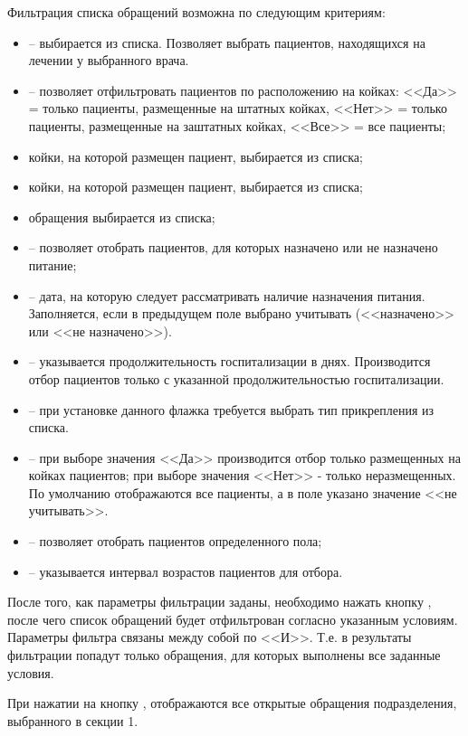 Фильтрация списка обращений возможна по следующим критериям:
\begin{itemize}
 \item {} – выбирается из списка. Позволяет выбрать пациентов, находящихся на лечении у выбранного врача.
 \item {} – позволяет отфильтровать пациентов по расположению на койках: <<Да>> = только пациенты, размещенные на штатных койках, <<Нет>> = только пациенты, размещенные на заштатных койках, <<Все>> = все пациенты;
 \item {} койки, на которой размещен пациент, выбирается из списка;
 \item {} койки, на которой размещен пациент, выбирается из списка;
 \item {} обращения выбирается из списка;
 \item {} – позволяет отобрать пациентов, для которых назначено или не назначено питание;
 \item {} – дата, на которую следует рассматривать наличие назначения питания. Заполняется, если в предыдущем поле выбрано учитывать (<<назначено>> или <<не назначено>>).
 \item {} – указывается продолжительность госпитализации в днях. Производится отбор пациентов только с указанной продолжительностью госпитализации.
 \item {} – при установке данного флажка требуется выбрать тип прикрепления из списка.
 \item {} – при выборе значения <<Да>> производится отбор только размещенных на койках пациентов; при выборе значения <<Нет>> - только неразмещенных. По умолчанию отображаются все пациенты, а в поле указано значение <<не учитывать>>.
 \item {} – позволяет отобрать пациентов определенного пола;
 \item {} – указывается интервал возрастов пациентов для отбора.
\end{itemize}
 
После того, как параметры фильтрации заданы, необходимо нажать кнопку , после чего список обращений будет отфильтрован согласно указанным условиям. Параметры фильтра связаны между собой по <<И>>. Т.е. в результаты фильтрации попадут только обращения, для которых выполнены все заданные условия.

При нажатии на кнопку , отображаются все открытые обращения подразделения, выбранного в секции 1.

